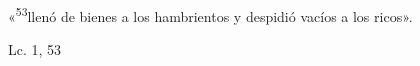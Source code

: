 \documentclass[../../rosario.tex]{subfiles}
\begin{document}
    «\textsuperscript{53}llenó de bienes a los hambrientos y despidió vacíos a los ricos».
    \begin{flushright}
    Lc. 1, 53
    \end{flushright}
\end{document}
